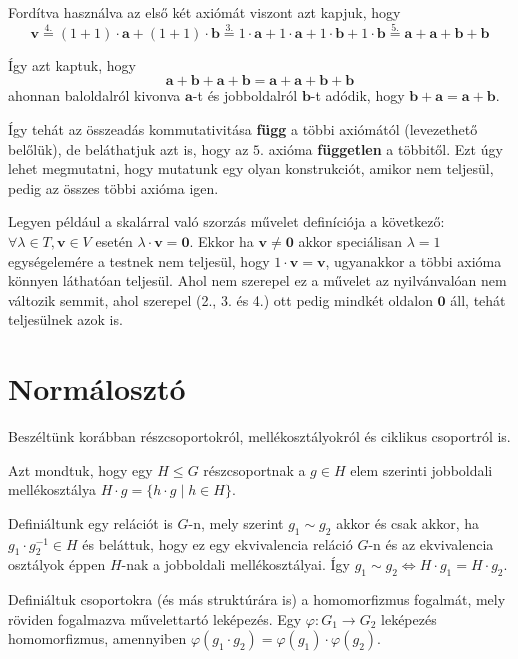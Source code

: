 \documentclass[12pt]{book}
\theoremstyle{plain} %
\theoremstyle{definition} %
\theoremstyle{remark}
\numberwithin{equation}{section}  %
\begin{document}
	Fordítva használva az első két axiómát viszont azt kapjuk, hogy
	\[ \mathbf{v} \stackrel{4.}{=} (1+1) \cdot \mathbf{a} + (1+1) \cdot \mathbf{b} 	 \stackrel{3.}{=} 1\cdot \mathbf{a} + 1\cdot \mathbf{a} + 1\cdot \mathbf{b} + 1\cdot \mathbf{b} \stackrel{5.}{=} \mathbf{a} + \mathbf{a} + \mathbf{b} + \mathbf{b}  \]
	
	Így azt kaptuk, hogy
	\[ \mathbf{a} + \mathbf{b} + \mathbf{a} + \mathbf{b} = \mathbf{a} + \mathbf{a} + \mathbf{b} + \mathbf{b} \]
	ahonnan baloldalról kivonva $\mathbf{a}$-t és jobboldalról $\mathbf{b}$-t adódik, hogy $\mathbf{b} + \mathbf{a} = \mathbf{a} + \mathbf{b}$.
	
	Így tehát az összeadás kommutativitása \textbf{függ} a többi axiómától (levezethető belőlük), de beláthatjuk azt is, hogy az $5.$ axióma \textbf{független} a többitől. Ezt úgy lehet megmutatni, hogy mutatunk egy olyan konstrukciót, amikor nem teljesül, pedig az összes többi axióma igen.
	
	Legyen például a skalárral való szorzás művelet definíciója a következő: $\forall \lambda\in T, \mathbf{v} \in V$ esetén $\lambda \cdot \mathbf{v} = \mathbf{0}$. Ekkor ha $\mathbf{v}\neq \mathbf{0}$ akkor speciálisan $\lambda = 1$ egységelemére a testnek nem teljesül, hogy $1\cdot \mathbf{v} = \mathbf{v}$, ugyanakkor a többi axióma könnyen láthatóan teljesül. Ahol nem szerepel ez a művelet az nyilvánvalóan nem változik semmit, ahol szerepel (2., 3. és 4.) ott pedig mindkét oldalon $\mathbf{0}$ áll, tehát teljesülnek azok is.
	

	\section{Normálosztó}
	
	Beszéltünk korábban részcsoportokról, mellékosztályokról és ciklikus csoportról is.
	
	Azt mondtuk, hogy egy $H\leq G$ részcsoportnak a $g\in H$ elem szerinti jobboldali mellékosztálya $H\cdot g = \{ h\cdot g \mid h\in H \} $.
	
	Definiáltunk egy relációt is $G$-n, mely szerint $g_1 \sim g_2$ akkor és csak akkor, ha $g_1\cdot g_2^{-1}\in H$ és beláttuk, hogy ez egy ekvivalencia reláció $G$-n és az ekvivalencia osztályok éppen $H$-nak a jobboldali mellékosztályai. Így $g_1\sim g_2 \Leftrightarrow H\cdot g_1 = H \cdot g_2$.
	
	Definiáltuk csoportokra (és más struktúrára is) a homomorfizmus fogalmát, mely röviden fogalmazva művelettartó leképezés. Egy $\varphi: G_1 \to G_2$ leképezés homomorfizmus, amennyiben $\varphi(g_1\cdot g_2) = \varphi(g_1) \cdot \varphi(g_2)$.
	
\end{document}

